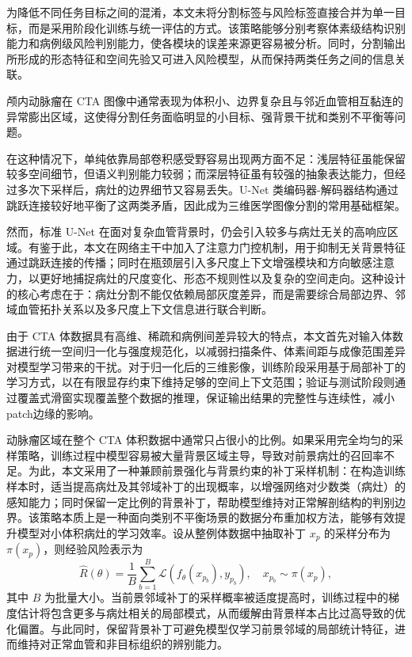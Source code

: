 为降低不同任务目标之间的混淆，本文未将分割标签与风险标签直接合并为单一目标，而是采用阶段化训练与统一评估的方式。该策略能够分别考察体素级结构识别能力和病例级风险判别能力，使各模块的误差来源更容易被分析。同时，分割输出所形成的形态特征和空间先验又可进入风险模型，从而保持两类任务之间的信息关联。


颅内动脉瘤在 CTA 图像中通常表现为体积小、边界复杂且与邻近血管相互黏连的异常膨出区域，这使得分割任务面临明显的小目标、强背景干扰和类别不平衡等问题。

在这种情况下，单纯依靠局部卷积感受野容易出现两方面不足：浅层特征虽能保留较多空间细节，但语义判别能力较弱；而深层特征虽有较强的抽象表达能力，但经过多次下采样后，病灶的边界细节又容易丢失。U-Net 类编码器-解码器结构通过跳跃连接较好地平衡了这两类矛盾，因此成为三维医学图像分割的常用基础框架。

然而，标准 U-Net 在面对复杂血管背景时，仍会引入较多与病灶无关的高响应区域。有鉴于此，本文在网络主干中加入了注意力门控机制，用于抑制无关背景特征通过跳跃连接的传播；同时在瓶颈层引入多尺度上下文增强模块和方向敏感注意力，以更好地捕捉病灶的尺度变化、形态不规则性以及复杂的空间走向。这种设计的核心考虑在于：病灶分割不能仅依赖局部灰度差异，而是需要综合局部边界、邻域血管拓扑关系以及多尺度上下文信息进行联合判断。


由于 CTA 体数据具有高维、稀疏和病例间差异较大的特点，本文首先对输入体数据进行统一空间归一化与强度规范化，以减弱扫描条件、体素间距与成像范围差异对模型学习带来的干扰。对于归一化后的三维影像，训练阶段采用基于局部补丁的学习方式，以在有限显存约束下维持足够的空间上下文范围；验证与测试阶段则通过覆盖式滑窗实现覆盖整个数据的推理，保证输出结果的完整性与连续性，减小patch边缘的影响。

动脉瘤区域在整个 CTA 体积数据中通常只占很小的比例。如果采用完全均匀的采样策略，训练过程中模型容易被大量背景区域主导，导致对前景病灶的召回率不足。为此，本文采用了一种兼顾前景强化与背景约束的补丁采样机制：在构造训练样本时，适当提高病灶及其邻域补丁的出现概率，以增强网络对少数类（病灶）的感知能力；同时保留一定比例的背景补丁，帮助模型维持对正常解剖结构的判别边界。该策略本质上是一种面向类别不平衡场景的数据分布重加权方法，能够有效提升模型对小体积病灶的学习效率。设从整例体数据中抽取补丁 $x_p$ 的采样分布为 $\pi(x_p)$，则经验风险表示为
\begin{equation}
\widehat{R}(\theta)=\frac{1}{B}\sum_{b=1}^{B}\mathcal{L}\left(f_{\theta}(x_{p_b}),y_{p_b}\right),\quad x_{p_b}\sim\pi(x_p),
\end{equation}
其中 $B$ 为批量大小。当前景邻域补丁的采样概率被适度提高时，训练过程中的梯度估计将包含更多与病灶相关的局部模式，从而缓解由背景样本占比过高导致的优化偏置。与此同时，保留背景补丁可避免模型仅学习前景邻域的局部统计特征，进而维持对正常血管和非目标组织的辨别能力。

